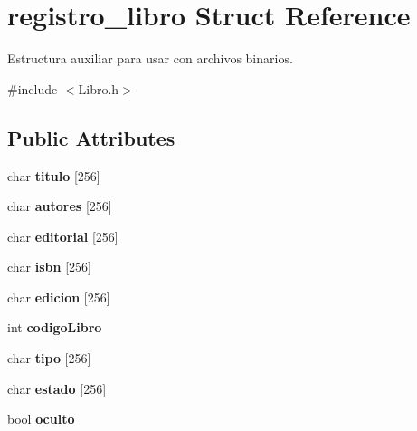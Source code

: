 \hypertarget{structregistro__libro}{}\section{registro\+\_\+libro Struct Reference}
\label{structregistro__libro}


Estructura auxiliar para usar con archivos binarios.  




{\ttfamily \#include $<$Libro.\+h$>$}

\subsection*{Public Attributes}
\begin{DoxyCompactItemize}
\item 
char {\bfseries titulo} \mbox{[}256\mbox{]}\hypertarget{structregistro__libro_a927d55558f66e31c65d7ae3f4fea2bbd}{}\label{structregistro__libro_a927d55558f66e31c65d7ae3f4fea2bbd}

\item 
char {\bfseries autores} \mbox{[}256\mbox{]}\hypertarget{structregistro__libro_afaabfd498d3abeb76fc8a8e28751a48e}{}\label{structregistro__libro_afaabfd498d3abeb76fc8a8e28751a48e}

\item 
char {\bfseries editorial} \mbox{[}256\mbox{]}\hypertarget{structregistro__libro_a8596876b7b2c3aca7705dd13d32432f2}{}\label{structregistro__libro_a8596876b7b2c3aca7705dd13d32432f2}

\item 
char {\bfseries isbn} \mbox{[}256\mbox{]}\hypertarget{structregistro__libro_ac46fbf13154b202dfdc11150cfca7d18}{}\label{structregistro__libro_ac46fbf13154b202dfdc11150cfca7d18}

\item 
char {\bfseries edicion} \mbox{[}256\mbox{]}\hypertarget{structregistro__libro_a54b8d33355302fb26f3419c39ceac311}{}\label{structregistro__libro_a54b8d33355302fb26f3419c39ceac311}

\item 
int {\bfseries codigo\+Libro}\hypertarget{structregistro__libro_ac310698580322d5c81e42fa966c25402}{}\label{structregistro__libro_ac310698580322d5c81e42fa966c25402}

\item 
char {\bfseries tipo} \mbox{[}256\mbox{]}\hypertarget{structregistro__libro_a69a7484699f12333b188201c16dd8f44}{}\label{structregistro__libro_a69a7484699f12333b188201c16dd8f44}

\item 
char {\bfseries estado} \mbox{[}256\mbox{]}\hypertarget{structregistro__libro_aef2348a0be46badd74226cc985dfaac7}{}\label{structregistro__libro_aef2348a0be46badd74226cc985dfaac7}

\item 
bool {\bfseries oculto}\hypertarget{structregistro__libro_a19773165ae718d16d6f2e5fb17e447f8}{}\label{structregistro__libro_a19773165ae718d16d6f2e5fb17e447f8}

\end{DoxyCompactItemize}


